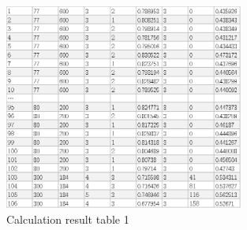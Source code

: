 \begin{figure}[H]
\centering
\includegraphics[width=0.7\textwidth]{figures/data3_3.png}
\caption{Calculation result table 1}
\label{fig:label}
\end{figure}

